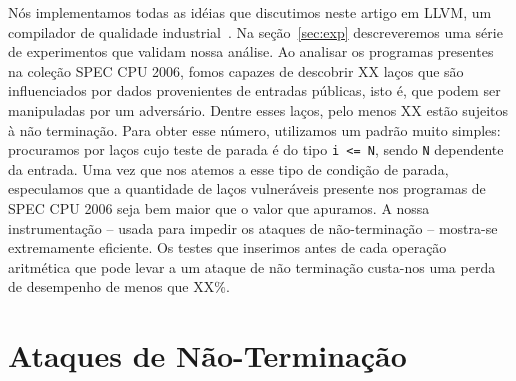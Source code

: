\documentclass{llncs}
\begin{document}
Nós implementamos todas as idéias que discutimos neste artigo em LLVM,
um compilador de qualidade industrial~\cite{Lattner04}.
Na seção~\ref{sec:exp} descreveremos uma série de experimentos que
validam nossa análise.
Ao analisar os programas presentes na coleção SPEC CPU 2006, fomos capazes
de descobrir XX laços que são influenciados por dados provenientes de
entradas públicas, isto é, que podem ser manipuladas por um adversário.
Dentre esses laços, pelo menos XX estão sujeitos à não terminação.
Para obter esse número, utilizamos um padrão muito simples: procuramos por
laços cujo teste de parada é do tipo \texttt{i <= N}, sendo \texttt{N}
dependente da entrada.
Uma vez que nos atemos a esse tipo de condição de parada, especulamos que
a quantidade de laços vulneráveis presente nos programas de SPEC CPU 2006
seja bem maior que o valor que apuramos.
A nossa instrumentação -- usada para impedir os ataques de não-terminação --
mostra-se extremamente eficiente.
Os testes que inserimos antes de cada operação aritmética que pode levar a
um ataque de não terminação custa-nos uma perda de desempenho de menos que
XX\%.

\section{Ataques de Não-Terminação}
\label{sec:bkg}
\end{document}
